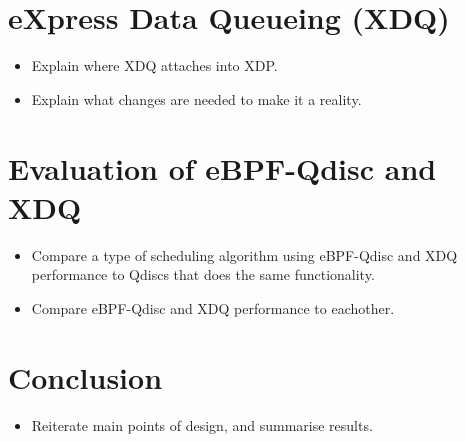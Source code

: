\documentclass[sigconf, nonacm]{acmart}
\begin{document}
\section{eXpress Data Queueing (XDQ)}

\begin{itemize}
  \item Explain where XDQ attaches into XDP.
  \item Explain what changes are needed to make it a reality.
\end{itemize}

\section{Evaluation of eBPF-Qdisc and XDQ}

\begin{itemize}
  \item Compare a type of scheduling algorithm using eBPF-Qdisc and XDQ performance to Qdiscs that does the same functionality.
  \item Compare eBPF-Qdisc and XDQ performance to eachother.
\end{itemize}

\section{Conclusion}

\begin{itemize}
  \item Reiterate main points of design, and summarise results.
\end{itemize}





\end{document}

